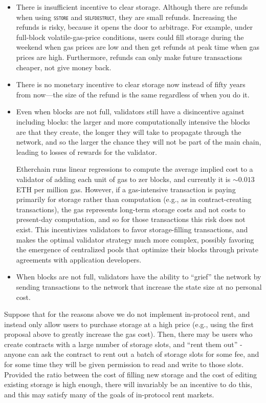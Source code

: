 \documentclass[12pt, final]{article}
\newcommand{\opcode}[1]{\textsc{\texttt{#1}}}
\begin{document}
\begin{itemize}
\item There is insufficient incentive to clear storage. Although there are refunds when using \opcode{sstore} and \opcode{selfdestruct}, they are small refunds.  Increasing the refunds is risky, because it opens the door to arbitrage. For example, under full-block volatile-gas-price conditions, users could fill storage during the weekend when gas prices are low and then get refunds at peak time when gas prices are high.  Furthermore, refunds can only make future transactions cheaper, not give money back.

\item There is no monetary incentive to clear storage now instead of fifty years from now---the size of the refund is the same regardless of when you do it.

\item Even when blocks are not full, validators still have a disincentive against including blocks: the larger and more computationally intensive the blocks are that they create, the longer they will take to propagate through the network, and so the larger the chance they will not be part of the main chain, leading to losses of rewards for the validator.

Etherchain runs linear regressions to compute the average implied cost \cite{etherchaingas} to a validator of adding each unit of gas to zer blocks, and currently it is $\sim \!\!0.013$ ETH per million gas. However, if a gas-intensive transaction is paying primarily for storage rather than computation (e.g., as in contract-creating transactions), the gas represents long-term storage costs and not costs to present-day computation, and so for those transactions this risk does not exist. This incentivizes validators to favor storage-filling transactions, and makes the optimal validator strategy much more complex, possibly favoring the emergence of centralized pools that optimize their blocks through private agreements with application developers.

\item When blocks are not full, validators have the ability to ``grief'' the network by sending transactions to the network that increase the state size at no personal cost.

\end{itemize}

Suppose that for the reasons above we do not implement in-protocol rent, and instead only allow users to purchase storage at a high price (e.g., using the first proposal above to greatly increase the gas cost). Then, there may be users who create contracts with a large number of storage slots, and ``rent them out'' - anyone can ask the contract to rent out a batch of storage slots for some fee, and for some time they will be given permission to read and write to those slots. Provided the ratio between the cost of filling new storage and the cost of editing existing storage is high enough, there will invariably be an incentive to do this, and this may satisfy many of the goals of in-protocol rent markets.
\end{document}
